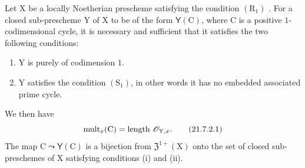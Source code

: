 \begin{proposition}[21.7.2]
\label{IV.21.7.2}
Let $\mathrm{X}$ be a locally Noetherian prescheme satisfying the condition $(\mathrm{R}_1)$ .
For a closed sub-prescheme $\mathrm{Y}$ of $\mathrm{X}$ to be of the form $\boldsymbol{\mathsf{Y}}(\mathrm{C})$, where $\mathrm{C}$ is a positive $1$-codimensional cycle, it is necessary and sufficient that it satisfies the two following conditions:
\begin{enumerate}[label=\textup{(\roman*)}]
  \item $\mathrm{Y}$ is purely of codimension $1$.
  \item $\mathrm{Y}$ satisfies the condition $(\mathrm{S}_1)$, in other words  it has no embedded associated prime cycle.
\end{enumerate}
We then have
\[
\label{IV.21.7.2.1}
  \operatorname{mult}_x(\mathrm{C})=\operatorname{length}\,\mathscr{O}_{\mathrm{Y},x}.
  \tag{21.7.2.1}
\]
The map $\mathrm{C}\leadsto\boldsymbol{\mathsf{Y}}(\mathrm{C})$ is a bijection from $\mathfrak{Z}^{1+}(\mathrm{X})$ onto the set of closed sub-preschemes of $\mathrm{X}$ satisfying conditions \textup{(i)} and \textup{(ii)}.
\end{proposition}

